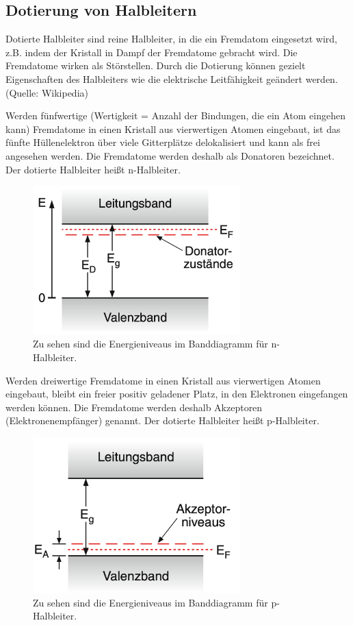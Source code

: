 \subsection{Dotierung von Halbleitern}
Dotierte Halbleiter sind reine Halbleiter, in die ein Fremdatom eingesetzt wird, z.B. indem der Kristall in Dampf der Fremdatome gebracht wird. Die Fremdatome wirken als Störstellen. \cite{demtroeder}
Durch die Dotierung können gezielt Eigenschaften des Halbleiters wie die elektrische Leitfähigkeit geändert werden. (Quelle: Wikipedia)


Werden fünfwertige (Wertigkeit = Anzahl der Bindungen, die ein Atom eingehen kann) Fremdatome in einen Kristall aus vierwertigen Atomen eingebaut, ist das fünfte Hüllenelektron über viele Gitterplätze delokalisiert und kann als frei angesehen werden. Die Fremdatome werden deshalb als Donatoren bezeichnet. Der dotierte Halbleiter heißt n-Halbleiter. \cite{demtroeder}
\begin{figure}
    \centering
    \includegraphics[width=8cm]{fotos/Donator.png}
    \caption{Zu sehen sind die Energieniveaus im Banddiagramm für n-Halbleiter. \cite{demtroeder}}
    \label{fig:donator}
\end{figure}


Werden dreiwertige Fremdatome in einen Kristall aus vierwertigen Atomen eingebaut, bleibt ein freier positiv geladener Platz, in den Elektronen eingefangen werden können. Die Fremdatome werden deshalb Akzeptoren (Elektronenempfänger) genannt. Der dotierte Halbleiter heißt p-Halbleiter. \cite{demtroeder} 
\begin{figure}
    \centering
    \includegraphics[width=8cm]{fotos/Akzeptor.png}
    \caption{Zu sehen sind die Energieniveaus im Banddiagramm für p-Halbleiter. \cite{demtroeder}}
    \label{fig:akzeptor}
\end{figure}

